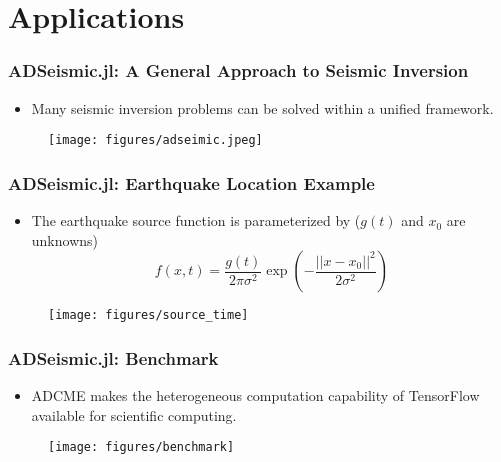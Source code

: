 \documentclass[usenames,dvipsnames]{beamer}
\begin{document}
\section{Applications}



\begin{frame}
	\frametitle{ADSeismic.jl: A General Approach to Seismic Inversion}
	\begin{itemize}
		\item Many seismic inversion problems can be solved within a unified framework. 
	\end{itemize}
	\begin{figure}[hbt]
  \texttt{[image: figures/adseimic.jpeg]}
\end{figure}
	
\end{frame}

\begin{frame}
	\frametitle{ADSeismic.jl: Earthquake Location Example}
	\begin{itemize}
		\item The earthquake source function is parameterized by ($g(t)$ and $x_0$ are unknowns)
		$$f(x, t) =  \frac{g(t)}{2\pi \sigma^2} \exp \left( -\frac{||x - x_0||^2}{2 \sigma^2} \right)$$
	\end{itemize}
	\begin{figure}[hbt]
  \texttt{[image: figures/source\_time]}
\end{figure}
\end{frame}


\begin{frame}
	\frametitle{ADSeismic.jl: Benchmark}
	\begin{itemize}
		\item ADCME makes the heterogeneous computation capability of TensorFlow available for scientific computing. 
	\end{itemize}
	\begin{figure}[hbt]
  \texttt{[image: figures/benchmark]}
\end{figure}
\end{frame}
\end{document}
